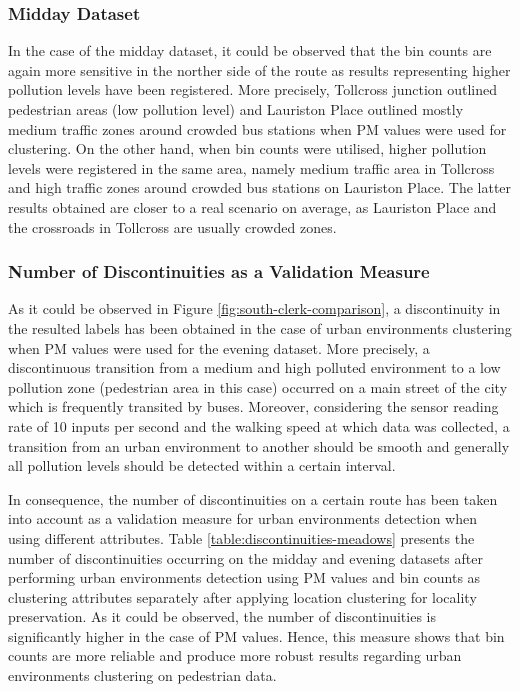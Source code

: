 \documentclass[bsc,frontabs,twoside,singlespacing,parskip,deptreport]{infthesis}     %
\begin{document}
\subsubsection*{Midday Dataset}

In the case of the midday dataset, it could be observed that the bin counts are again more sensitive in the norther side of the route as results representing higher pollution levels have been registered. More precisely, Tollcross junction outlined pedestrian areas (low pollution level) and Lauriston Place outlined mostly medium traffic zones around crowded bus stations when PM values were used for clustering. On the other hand, when bin counts were utilised, higher pollution levels were registered in the same area, namely medium traffic area in Tollcross and high traffic zones around crowded bus stations on Lauriston Place. The latter results obtained are closer to a real scenario on average, as Lauriston Place and the crossroads in Tollcross are usually crowded zones.

\subsubsection*{Number of Discontinuities as a Validation Measure}

As it could be observed in Figure \ref{fig:south-clerk-comparison}, a discontinuity in the resulted labels has been obtained in the case of urban environments clustering when PM values were used for the evening dataset. More precisely, a discontinuous transition from a medium and high polluted environment to a low pollution zone (pedestrian area in this case) occurred on a main street of the city which is frequently transited by buses. Moreover, considering the sensor reading rate of 10 inputs per second and the walking speed at which data was collected, a transition from an urban environment to another should be smooth and generally all pollution levels should be detected within a certain interval.

In consequence, the number of discontinuities on a certain route has been taken into account as a validation measure for urban environments detection when using different attributes. Table \ref{table:discontinuities-meadows} presents the number of discontinuities occurring on the midday and evening datasets after performing urban environments detection using PM values and bin counts as clustering attributes separately after applying location clustering for locality preservation. As it could be observed, the number of discontinuities is significantly higher in the case of PM values. Hence, this measure shows that bin counts are more reliable and produce more robust results regarding urban environments clustering on pedestrian data.
\end{document}
